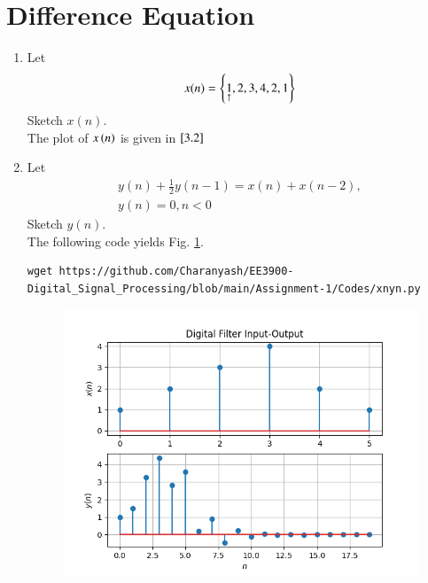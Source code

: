 \documentclass[journal,12pt,twocolumn]{IEEEtran}
\renewcommand\thesection{\arabic{section}}
\begin{document}
\section{Difference Equation}
\begin{enumerate}[label=\thesection.\arabic*,ref=\thesection.\theenumi]
\item Let
\begin{equation}
x(n) = \left\{\underset{\uparrow}{1},2,3,4,2,1\right\}
\end{equation}
Sketch $x(n)$.\\
\solution The plot of $x\left(n\right)$ is given in $\ref{3.2}$
\item \label{3.2} Let
\begin{multline}
\label{eq:iir_filter}
y(n) + \frac{1}{2}y(n-1) = x(n) + x(n-2), 
\\
 y(n) = 0, n < 0
\end{multline}
Sketch $y(n)$.\\
\solution The following code yields Fig. \ref{fig:xnyn}.
\begin{lstlisting}
wget https://github.com/Charanyash/EE3900-Digital_Signal_Processing/blob/main/Assignment-1/Codes/xnyn.py
\end{lstlisting}
\begin{figure}[!ht]
\begin{center}
\includegraphics[width=\columnwidth]{xnyn.png}
\end{center}
\label{fig:xnyn}	
\end{figure}

\end{enumerate}
\end{document}
